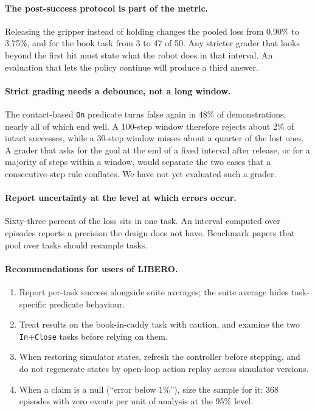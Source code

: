 \documentclass[10pt,twocolumn]{article}
\newcommand{\pred}[1]{\texttt{#1}}
\begin{document}
\paragraph{The post-success protocol is part of the metric.} Releasing the gripper instead of holding changes the pooled loss from 0.90\% to 3.75\%, and for the book task from 3 to 47 of 50. Any stricter grader that looks beyond the first hit must state what the robot does in that interval. An evaluation that lets the policy continue will produce a third answer.

\paragraph{Strict grading needs a debounce, not a long window.} The contact-based \pred{On} predicate turns false again in 48\% of demonstrations, nearly all of which end well. A 100-step window therefore rejects about 2\% of intact successes, while a 30-step window misses about a quarter of the lost ones. A grader that asks for the goal at the end of a fixed interval after release, or for a majority of steps within a window, would separate the two cases that a consecutive-step rule conflates. We have not yet evaluated such a grader.

\paragraph{Report uncertainty at the level at which errors occur.} Sixty-three percent of the loss sits in one task. An interval computed over episodes reports a precision the design does not have. Benchmark papers that pool over tasks should resample tasks.

\paragraph{Recommendations for users of LIBERO.}
\begin{enumerate}
\item Report per-task success alongside suite averages; the suite average hides task-specific predicate behaviour.
\item Treat results on the book-in-caddy task with caution, and examine the two \pred{In}+\pred{Close} tasks before relying on them.
\item When restoring simulator states, refresh the controller before stepping, and do not regenerate states by open-loop action replay across simulator versions.
\item When a claim is a null (``error below 1\%''), size the sample for it: 368 episodes with zero events per unit of analysis at the 95\% level.
\end{enumerate}
\end{document}
